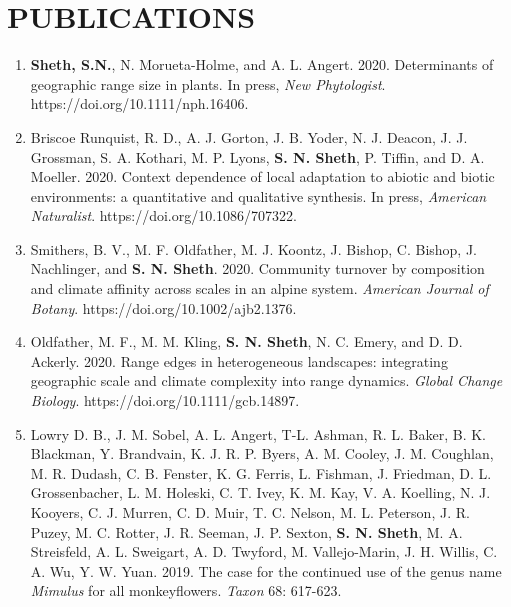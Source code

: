 \documentclass[11pt,english]{article}\usepackage[]{graphicx}\usepackage[]{color}
\newcommand\reverselabel[1]{%
  \def\theenumi{}%
  \renewcommand\makelabel{\makebox[\dimexpr\labelwidth-3pt\relax][r]{%
    \the\numexpr#1-\value{enumi}+1\relax}}}%
\begin{document}
\section*{PUBLICATIONS}
\vspace{-0.5ex}
\begin{hangparas}{.5in}{1}
\begin{enumerate}
\reverselabel{20} %

\item \textbf{Sheth, S.N.}, N. Morueta-Holme, and A. L. Angert. 2020. Determinants of geographic range size in plants. In press, \emph{New Phytologist}. https://doi.org/10.1111/nph.16406.

\item Briscoe Runquist, R. D., A. J. Gorton, J. B. Yoder, N. J. Deacon, J. J. Grossman, S. A. Kothari, M. P. Lyons, \textbf{S. N. Sheth}, P. Tiffin, and D. A. Moeller. 2020. Context dependence of local adaptation to abiotic and biotic environments: a quantitative and qualitative synthesis. In press, \emph{American Naturalist}. https://doi.org/10.1086/707322.

\item Smithers, B. V., M. F. Oldfather, M. J. Koontz, J. Bishop, C. Bishop, J. Nachlinger, and \textbf{S. N. Sheth}. 2020. Community turnover by composition and climate affinity across scales in an alpine system. \emph{American Journal of Botany}. https://doi.org/10.1002/ajb2.1376.

\item Oldfather, M. F., M. M. Kling, \textbf{S. N. Sheth}, N. C. Emery, and D. D. Ackerly. 2020. Range edges in heterogeneous landscapes: integrating geographic scale and climate complexity into range dynamics. \emph{Global Change Biology}. https://doi.org/10.1111/gcb.14897. 

\item Lowry D. B., J. M. Sobel, A. L. Angert, T-L. Ashman, R. L. Baker, B. K. Blackman, Y. Brandvain, K. J. R. P. Byers, A. M. Cooley, J. M. Coughlan, M. R. Dudash, C. B. Fenster, K. G. Ferris, L. Fishman, J. Friedman, D. L. Grossenbacher, L. M. Holeski, C. T. Ivey, K. M. Kay, V. A. Koelling, N. J. Kooyers, C. J. Murren, C. D. Muir, T. C. Nelson, M. L. Peterson, J. R. Puzey, M. C. Rotter, J. R. Seeman, J. P. Sexton, \textbf{S. N. Sheth}, M. A. Streisfeld, A. L. Sweigart, A. D. Twyford, M. Vallejo-Marin, J. H. Willis, C. A. Wu, Y. W. Yuan. 2019. The case for the continued use of the genus name \textit{Mimulus} for all monkeyflowers. \emph{Taxon} 68: 617-623. 


\end{enumerate}
\end{hangparas}
\end{document}
